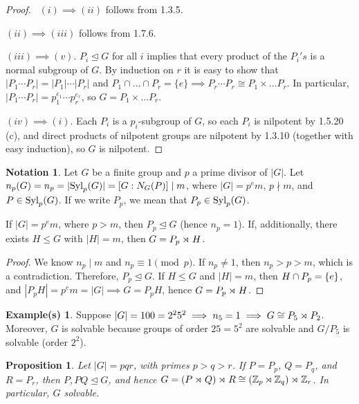 \documentclass[11pt]{book}
\newcounter{counter}
\newtheorem{proposition}[counter]{Proposition}   \newtheorem{problem}[counter]{Problem}   \newtheorem*{proposition*}{Proposition}   \newtheorem*{lemma*}{Lemma}
\theoremstyle{definition}   \newtheorem{defn}[counter]{Definition} %
\newtheorem*{notation*}{Notation}   \newtheorem{example}[counter]{Example(s)}   \newtheorem*{example*}{Example(s)}   \newtheorem*{warning}{Warning} \newtheorem*{corollary*}{Corollary}
\newcommand{\nsg}{\mathrel{\unlhd}}   \newcommand{\ind}{\parindent24pt}   \newcommand{\vn}{\varnothing}
\newcommand{\vs}{\vspace{8pt}}
\numberwithin{counter}{chapter}
\begin{document}
\begin{proof}\
$(i) \implies (ii)$ follows from 1.3.5.

$(ii) \implies (iii)$ follows from 1.7.6.

$(iii) \implies (v)$. $P_i \nsg G$ for all $i$ implies that every product of the $P_i's$ is a normal subgroup of $G$. By induction on $r$ it is easy to show that $|P_1 \cdots P_r| = |P_1| \cdots |P_r|$ and $P_1 \cap \dots \cap P_r = \{e\} \implies P_r \cdots P_r \cong P_1 \times \dots P_r$. In particular, $|P_1 \cdots P_r| = p_1^{e_1} \cdots p_r^{e_r}$, so $G = P_1 \times \dots P_r$.

$(iv) \implies (i)$. Each $P_i$ is a $p_i$-subgroup of $G$, so each $P_i$ is nilpotent by 1.5.20 (c), and direct products of nilpotent groups are nilpotent by 1.3.10 (together with easy induction), so $G$ is nilpotent.
\end{proof}

\vs

\begin{notation*}
Let $G$ be a finite group and $p$ a prime divisor of $|G|$. Let $n_p(G) = n_p = |\textnormal{Syl}_p(G)| = [G : N_G(P)] \mid m$, where $|G| = p^em$, $p\nmid m$, and $P \in \textnormal{Syl}_p(G)$. If we write $P_p$, we mean that $P_p \in \textnormal{Syl}_p(G)$.
\end{notation*}

\vs

\begin{lemma}[Generalization of 1.6.10]
If $|G| = p^em$, where $p > m$, then $P_p \nsg G$ (hence $n_p = 1$). If, additionally, there exists $H \leq G$ with $|H| = m$, then $G = P_p \rtimes_{} H$.
\end{lemma}

\begin{proof}
We know $n_p \mid m$ and $n_p \equiv 1 \pmod{p}$. If $n_p \ne 1$, then $n_p > p > m$, which is a contradiction. Therefore, $P_p \nsg G$. If $H \leq G$ and $|H| = m$, then $H \cap P_p = \{e\}$, and $|P_pH| = p^em = |G| \implies G = P_p H$, hence $G = P_p \rtimes_{} H$.
\end{proof}

\vs

\begin{example*}
Suppose $|G| = 100 = 2^25^2 \implies n_5 = 1 \implies G \cong P_5 \rtimes_{} P_2$. Moreover, $G$ is solvable because groups of order $25 = 5^2$ are solvable and $G/P_5$ is solvable (order $2^2$).
\end{example*}

\vs

\begin{proposition}
Let $|G| = pqr$, with primes $p > q > r$. If $P = P_p$, $Q = P_q$, and $R = P_r$, then $P,PQ \nsg G$, and hence $G = (P \rtimes_{} Q) \rtimes_{} R \cong (\operatorname{\mathbb{Z}}_p \rtimes_{} \operatorname{\mathbb{Z}}_q) \rtimes_{} \operatorname{\mathbb{Z}}_r$. In particular, $G$ solvable.
\end{proposition}
\end{document}
